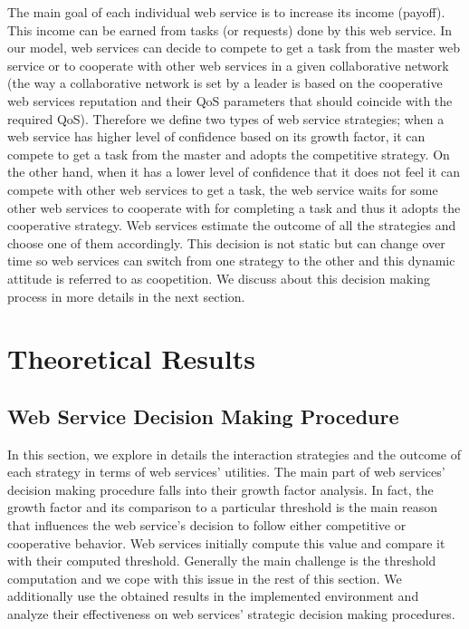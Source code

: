\documentclass[fleqn]{singlecol-new}
\begin{document}
The main goal of each individual web service is to increase its
income (payoff). This income can be earned from tasks (or
requests) done by this web service. In our model, web services can
decide to compete to get a task from the master web service or to
cooperate with other web services in a given collaborative network
(the way a collaborative network is set by a leader is based on
the cooperative web services reputation and their QoS parameters
that should coincide with the required QoS). Therefore we define
two types of web service strategies; when a web service has higher
level of confidence based on its growth factor, it can compete to
get a task from the master and adopts the competitive strategy. On
the other hand, when it has a lower level of confidence that it
does not feel it can compete with other web services to get a
task, the web service waits for some other web services to
cooperate with for completing a task and thus it adopts the
cooperative strategy. Web services estimate the outcome of all the
strategies and choose one of them accordingly. This decision is
not static but can change over time so web services can switch
from one strategy to the other and this dynamic attitude is
referred to as coopetition. We discuss about this decision making
process in more details in the next section.








\section{Theoretical Results}\label{Theoretical Results}

\subsection{Web Service Decision Making Procedure}
In this section, we explore in details the interaction strategies
and the outcome of each strategy in terms of web services'
utilities. The main part of web services' decision making
procedure falls into their growth factor analysis. In fact, the
growth factor and its comparison to a particular threshold is the
main reason that influences the web service's decision to follow
either competitive or cooperative behavior. Web services initially
compute this value and compare it with their computed threshold.
Generally the main challenge is the threshold computation and we
cope with this issue in the rest of this section. We additionally
use the obtained results in the implemented environment and
analyze their effectiveness on web services' strategic decision
making procedures.
\end{document}
